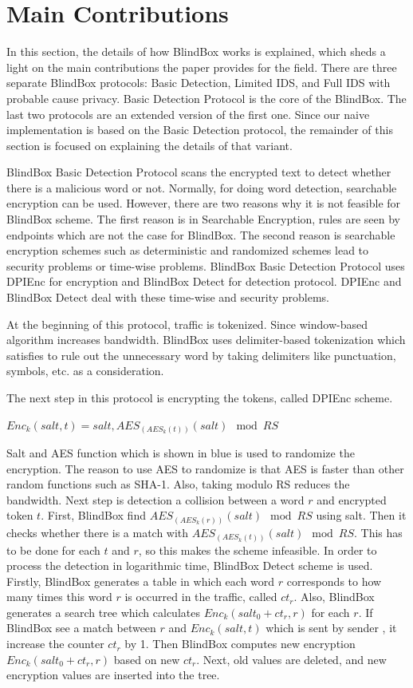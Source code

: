 \documentclass{winslabreport}
\begin{document}
\section{Main Contributions} \label{maincontributions}

In this section, the details of how BlindBox works is explained, which sheds a light on the main contributions the paper provides for the field. There are three separate BlindBox protocols: Basic Detection, Limited IDS, and Full IDS with probable cause privacy. Basic Detection Protocol is the core of the BlindBox. The last two protocols are an extended version of the first one. Since our naive implementation is based on the Basic Detection protocol, the remainder of this section is focused on explaining the details of that variant.

BlindBox Basic Detection Protocol scans the encrypted text to detect whether there is a malicious word or not. Normally, for doing word detection, searchable encryption can be used. However, there are two reasons why it is not feasible for BlindBox scheme. The first reason is in Searchable Encryption, rules are seen by endpoints which are not the case for BlindBox. The second reason is searchable encryption schemes such as deterministic and randomized schemes lead to security problems or time-wise problems. BlindBox Basic Detection Protocol uses DPIEnc for encryption and BlindBox Detect for detection protocol. DPIEnc and BlindBox Detect deal with these time-wise and security problems.

At the beginning of this protocol, traffic is tokenized. Since window-based algorithm increases bandwidth.  BlindBox uses delimiter-based tokenization which satisfies to rule out the unnecessary word by taking delimiters like punctuation, symbols, etc. as a consideration.

The next step in this protocol is encrypting the tokens, called DPIEnc scheme. 

\begin{center}
	$Enc_k(salt,t)= salt, AES_(AES_k(t))(salt) \mod RS$
\end{center}

Salt and AES function which is shown in blue is used to randomize the encryption. The reason to use AES to randomize is that AES is faster than other random functions such as SHA-1. Also, taking modulo RS reduces the bandwidth. Next step is detection a collision between a word $r$ and encrypted token $t$. First, BlindBox find $AES_(AES_k(r))(salt) \mod RS$ using salt. Then it checks whether there is a match with $AES_(AES_k(t))(salt) \mod RS$. This has to be done for each $t$ and $r$, so this makes the scheme infeasible. In order to process the detection in logarithmic time, BlindBox Detect scheme is used. Firstly, BlindBox generates a table in which each word $r$ corresponds to how many times this word $r$ is occurred in the traffic, called $ct_r$. Also, BlindBox generates a search tree which calculates $Enc_k(salt_0+ct_r,r)$ for each $r$. If BlindBox see a match between $r$ and $Enc_k(salt,t)$ which is sent by sender , it increase the counter $ct_r$ by 1. Then BlindBox computes new encryption $Enc_k(salt_0+ct_r,r)$ based on new $ct_r$.  Next, old values are deleted, and new encryption values are inserted into the tree.
\end{document}
